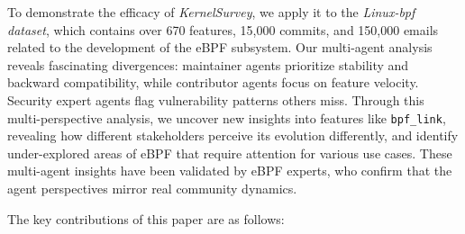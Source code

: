 \documentclass[sigconf,review,anonymous]{acmart}
\newcommand{\sys}{\textit{KernelSurvey}\xspace}
\begin{document}
To demonstrate the efficacy of \sys, we apply it to the \textit{Linux-bpf dataset}, which contains over 670 features, 15,000 commits, and 150,000 emails related to the development of the eBPF subsystem. Our multi-agent analysis reveals fascinating divergences: maintainer agents prioritize stability and backward compatibility, while contributor agents focus on feature velocity. Security expert agents flag vulnerability patterns others miss. Through this multi-perspective analysis, we uncover new insights into features like \texttt{bpf\_link}, revealing how different stakeholders perceive its evolution differently, and identify under-explored areas of eBPF that require attention for various use cases. These multi-agent insights have been validated by eBPF experts, who confirm that the agent perspectives mirror real community dynamics.

% 
The key contributions of this paper are as follows:
\end{document}
